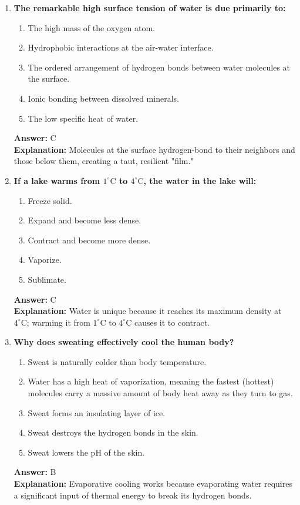 \documentclass[11pt, a4paper]{article}
\begin{document}
\begin{enumerate}
\item \textbf{The remarkable high surface tension of water is due primarily to:}
\begin{enumerate}[label=\Alph*.]
    \item The high mass of the oxygen atom.
    \item Hydrophobic interactions at the air-water interface.
    \item The ordered arrangement of hydrogen bonds between water molecules at the surface.
    \item Ionic bonding between dissolved minerals.
    \item The low specific heat of water.
\end{enumerate}
\textbf{Answer:} C \\
\textbf{Explanation:} Molecules at the surface hydrogen-bond to their neighbors and those below them, creating a taut, resilient "film."

\item \textbf{If a lake warms from $1^\circ\text{C}$ to $4^\circ\text{C}$, the water in the lake will:}
\begin{enumerate}[label=\Alph*.]
    \item Freeze solid.
    \item Expand and become less dense.
    \item Contract and become more dense.
    \item Vaporize.
    \item Sublimate.
\end{enumerate}
\textbf{Answer:} C \\
\textbf{Explanation:} Water is unique because it reaches its maximum density at $4^\circ\text{C}$; warming it from $1^\circ\text{C}$ to $4^\circ\text{C}$ causes it to contract.

\item \textbf{Why does sweating effectively cool the human body?}
\begin{enumerate}[label=\Alph*.]
    \item Sweat is naturally colder than body temperature.
    \item Water has a high heat of vaporization, meaning the fastest (hottest) molecules carry a massive amount of body heat away as they turn to gas.
    \item Sweat forms an insulating layer of ice.
    \item Sweat destroys the hydrogen bonds in the skin.
    \item Sweat lowers the pH of the skin.
\end{enumerate}
\textbf{Answer:} B \\
\textbf{Explanation:} Evaporative cooling works because evaporating water requires a significant input of thermal energy to break its hydrogen bonds.


\end{enumerate}
\end{document}
